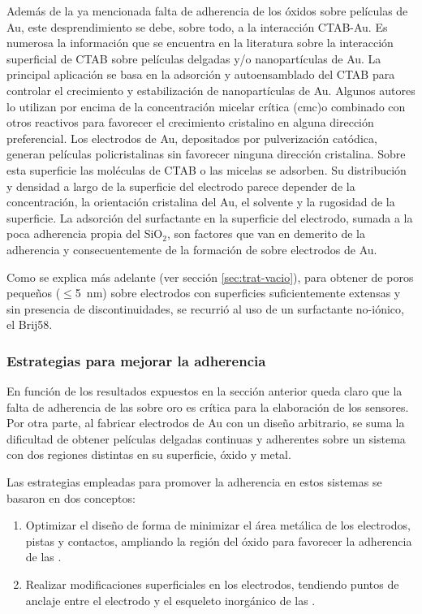 			Además de la ya mencionada falta de adherencia de los óxidos sobre películas de Au, este desprendimiento se debe, sobre todo, a la interacción CTAB-Au. Es numerosa la información que se encuentra en la literatura sobre la interacción superficial de CTAB sobre películas delgadas y/o nanopartículas de Au. La principal aplicación se basa en la adsorción y autoensamblado del CTAB para controlar el crecimiento y estabilización de nanopartículas de Au. \cite{Cheng2003,Smith2008,Meena2013,Wang2013,Hamon2009} Algunos autores lo utilizan por encima de la concentración micelar crítica (cmc)\cite{Lim2014}o combinado con otros reactivos para favorecer el crecimiento cristalino en alguna dirección preferencial\cite{Smith2009}. Los electrodos de Au, depositados por pulverización catódica, generan películas policristalinas sin favorecer ninguna dirección cristalina.\cite{Svorcik2010,Bechelany2010} Sobre esta superficie las moléculas de CTAB o las micelas se adsorben. Su distribución y densidad a largo de la superficie del electrodo parece depender de la concentración, la orientación cristalina del Au, el solvente y la rugosidad de la superficie\cite{Meena2013,Lim2014}. La adsorción del surfactante en la superficie del electrodo, sumada a la poca adherencia propia del SiO$_2$, son factores que van en demerito de la adherencia y consecuentemente de la formación de \pdmC\space sobre electrodos de Au. 
			
			Como se explica más adelante (ver sección \ref{sec:trat-vacio}), para obtener \pdm\space de poros pequeños ($\leq$\SI{5}{\nm}) sobre electrodos con superficies suficientemente extensas y sin presencia de discontinuidades, se recurrió al uso de un surfactante no-iónico, el Brij58.
							
		\subsubsection{Estrategias para mejorar la adherencia}\label{sec:adherencia}

			 En función de los resultados expuestos en la sección anterior queda claro que la falta de adherencia de las \pdm\space sobre oro es crítica para la elaboración de los sensores. Por otra parte, al fabricar electrodos de Au con un diseño arbitrario, se suma la dificultad de obtener películas delgadas continuas y adherentes sobre un sistema con dos regiones distintas en su superficie, óxido y metal.
 
             Las estrategias empleadas para promover la adherencia en estos sistemas se basaron en dos conceptos:
				\begin{enumerate}

					\item Optimizar el diseño de forma de minimizar el área metálica de los electrodos, pistas y contactos, ampliando la región del óxido para favorecer la adherencia de las \pdm.

					\item Realizar modificaciones superficiales en los electrodos, tendiendo puntos de anclaje entre el electrodo y el esqueleto inorgánico de las \pdm.

					\end{enumerate}
			

